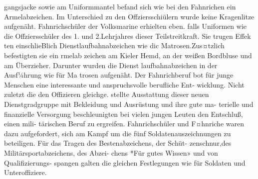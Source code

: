 gangsjacke sowie am Uniformmantel befand sich
wie bei den Fahnrichen ein Armelabzeichen. Im
Unterschied zu den Offziersschiülern wurde keine
Kragenlitze aufgenäht.
Fahnrichschüler der Volksmarine erhielten eben.
falls Uniformen wie die Offziersschüler des 1. und
2.Lehrjahres dieser Teilstreitkraft. Sie trugen Effek
ten einschlieBlich Dienstlaufbahnabzeichen wie dic
Matrosen.Zus¤tzlich befestigten sie ein rmelab
zeichen am Kieler Hemd, an der weißen Bordbluse
und am Überzieher. Darunter wurden die Dienst
laufbahnabzeichen in der Ausf¼hrung wie für Ma
trosen aufgenäht.
Der Fahnrichberuf bot für junge Menschen eine interessante und anspruchsvolle berufliche Ent-
wicklung. Nicht zuletzt die den Offizieren gleichge.
stellte Ausstattung dieser neuen Dienstgradgruppe
mit Bekleidung und Ausrüstung und ihre gute ma-
terielle und finanzielle Versorgung beschleunigten
bei vielen jungen Leuten den Entschluß, einen mili-
tärischen Beruf zu ergreifen. Fahnrichschüler und
F¤hnriche waren dazu aufgefordert, sich am Kampf
um die fünf Soldatenauszeichnungen zu beteiligen.
Für das Tragen des Bestenabzeichens, der Schüt-
zenschnur,des Militärsportabzeichens, des Abzei-
chens *Für gutes Wissen» und von Qualifizierungs-
spangen galten die gleichen Festlegungen wie für
Soldaten und Unteroffiziere.